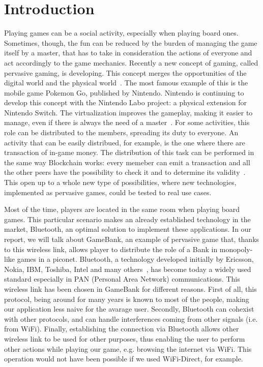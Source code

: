 \section{Introduction}

Playing games can be a social activity, especially when playing board ones. 
Sometimes, though, the fun can be reduced by the burden of managing the 
game itself by a master, that has to take in consideration the actions of 
everyone and act accordingly to the game mechanics. Recently a new concept of 
gaming, called pervasive gaming, is developing. This concept merges the 
opportunities of the digital world and the physical world~\cite{arango17}. The 
most famous example of this is the mobile game Pokemon Go, published by 
Nintendo. Nintendo is continuing to develop this concept with the Nintendo Labo 
project: a physical extension for Nintendo Switch.
The virtualization improves the gameplay, making it easier to manage, even if 
there is always the need of a master~\cite{bjork01}.
For some activities, this role can be distributed to the members, spreading its 
duty to everyone. An activity that can be easily distribued, for example, is the 
one where there are transaction of in-game money. The distribution of this task 
can be performed in the same way Blockchain works: every memeber can emit a 
transaction and all the other peers have the possibility to check it and to 
determine its validity~\cite{nakamoto08}. This open up to a whole new type of 
possibilities, where new technologies, implemented as pervasive games, could be 
tested to real use cases.

Most of the time, players are located in the same room when playing board 
games. This particular scenario makes an already established technology in 
the market, Bluetooth, an optimal solution to implement these applications. In 
our report, we will talk about GameBank, an example of pervasive game that, 
thanks to this wireless link, allows player to distribute the role of a Bank in 
monopoly-like games in a piconet.
Bluetooth, a technology developed initially by Ericsson, Nokia, IBM, Toshiba, 
Intel and many others~\cite{haartsen00}, has become today a widely used
standard especially in PAN (Personal Area Network) communications. This
wireless link has been chosen in GameBank for different reasons. First of all,
this protocol, being around for many years is known to most of the people,
making our application less naive for the avarage user. Secondly, Bluetooth can
cohexist with other protocols, and can handle interferences coming from other
signals (i.e. from WiFi). Finally, establishing the connection via Bluetooth
allows other wireless link to be used for other purposes, thus enabling the
user to perform other actions while playing our game, e.g. browsing the
internet via WiFi. This operation would not have been possible if we used 
WiFi-Direct, for example.\\

